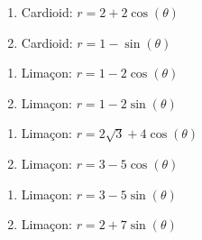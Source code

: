 \begin{multicols}{2} 

\begin{enumerate}

\setcounter{enumi}{\value{HW}}

\item Cardioid: $r = 2 + 2\cos(\theta)$ 
\item Cardioid: $r = 1 - \sin(\theta)$ 

\setcounter{HW}{\value{enumi}}

\end{enumerate}

\end{multicols}

\begin{multicols}{2} 

\begin{enumerate}

\setcounter{enumi}{\value{HW}}

\item Lima\c{c}on: $r = 1 - 2\cos(\theta)$ 
\item Lima\c{c}on: $r = 1 - 2\sin(\theta)$ 

\setcounter{HW}{\value{enumi}}

\end{enumerate}

\end{multicols}

\begin{multicols}{2} 

\begin{enumerate}

\setcounter{enumi}{\value{HW}}

\item Lima\c{c}on: $r = 2\sqrt{3} + 4\cos(\theta)$ 
\item Lima\c{c}on: $r = 3-5\cos(\theta)$

\setcounter{HW}{\value{enumi}}

\end{enumerate}

\end{multicols}

\begin{multicols}{2} 

\begin{enumerate}

\setcounter{enumi}{\value{HW}}

\item Lima\c{c}on: $r = 3-5\sin(\theta)$
\item Lima\c{c}on: $r = 2 + 7\sin(\theta)$ 

\setcounter{HW}{\value{enumi}}

\end{enumerate}

\end{multicols}

